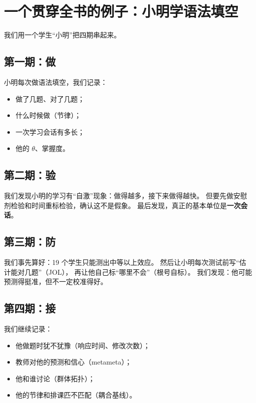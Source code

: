 \documentclass[UTF8,a4paper,11pt]{ctexart}
\begin{document}
\section{一个贯穿全书的例子：小明学语法填空}

我们用一个学生“小明”把四期串起来。

\subsection{第一期：做}

小明每次做语法填空，我们记录：

\begin{itemize}[leftmargin=2em]
\item 做了几题、对了几题；
\item 什么时候做（节律）；
\item 一次学习会话有多长；
\item 他的 $\theta$、掌握度。
\end{itemize}

\subsection{第二期：验}

我们发现小明的学习有“自激”现象：做得越多，接下来做得越快。
但要先做安慰剂检验和时间重标检验，确认这不是假象。
最后发现，真正的基本单位是\textbf{一次会话}。

\subsection{第三期：防}

我们事先算好：19 个学生只能测出中等以上效应。
然后让小明每次测试前写“估计能对几题”（JOL），
再让他自己标“哪里不会”（根号自标）。
我们发现：他可能预测得挺准，但不一定校准得好。

\subsection{第四期：接}

我们继续记录：

\begin{itemize}[leftmargin=2em]
\item 他做题时犹不犹豫（响应时间、修改次数）；
\item 教师对他的预测和信心（metameta）；
\item 他和谁讨论（群体拓扑）；
\item 他的节律和排课匹不匹配（耦合基线）。
\end{itemize}
\end{document}
